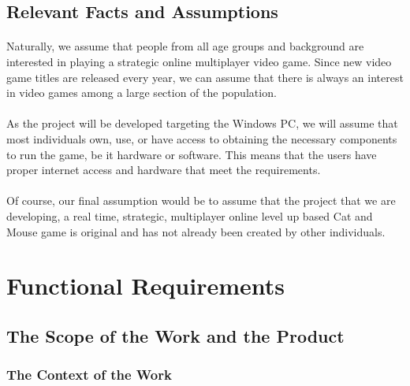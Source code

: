 \documentclass[12pt, titlepage]{article}
\begin{document}
\subsection{Relevant Facts and Assumptions}
\paragraph{}Naturally, we assume that people from all age groups and background are interested in playing a strategic online multiplayer video game. Since new video game titles are released every year, we can assume that there is always an interest in video games among a large section of the population.
\paragraph{}As the project will be developed targeting the Windows PC, we will assume that most individuals own, use, or have access to obtaining the necessary components to run the game, be it hardware or software.
This means that the users have proper internet access and hardware that meet the requirements.
\paragraph{}Of course, our final assumption would be to assume that the project that we are developing, a real time, strategic, multiplayer online level up based Cat and Mouse game is original and has not already been created by other individuals.
\section{Functional Requirements}
\subsection{The Scope of the Work and the Product}
\newpage
\subsubsection{The Context of the Work}
\end{document}
